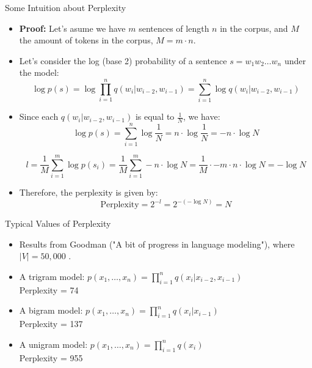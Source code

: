 \documentclass[10pt]{beamer}
\begin{document}
\begin{frame}{Some Intuition about Perplexity}
    \scriptsize
    \begin{itemize}
        
        
        \item \textbf{Proof:}  Let's asume we have $m$ sentences of length $n$ in the corpus, and $M$ the amount of tokens in the corpus, $M=m \cdot n$.
        
        \item Let's consider the log (base 2) probability of a sentence $s = w_1 w_2 \dots w_n$ under the model:
        \[
            \log p(s) = \log \prod_{i=1}^{n} q(w_i|w_{i-2}, w_{i-1}) = \sum_{i=1}^{n} \log q(w_i|w_{i-2}, w_{i-1})
        \]
        \item Since each $q(w_i|w_{i-2}, w_{i-1})$ is equal to $\frac{1}{N}$, we have:
        \[
            \log p(s) = \sum_{i=1}^{n} \log \frac{1}{N} = n \cdot \log \frac{1}{N} = -n \cdot \log N
        \]
        
        
        \[
            l =  \frac{1}{M} \sum_{i=1}^{m} \log p(s_i) = \frac{1}{M} \sum_{i=1}^{m} -n \cdot \log N  = \frac{1}{M} \cdot -m \cdot n \cdot \log N = - \log N 
        \]
        
        
        
        \item Therefore, the perplexity is given by:
        \[
            \text{Perplexity} = 2^{-l} = 2^{-(- \log N)} = N
        \]
    \end{itemize}
\end{frame}

\begin{frame}{Typical Values of Perplexity}
    \scriptsize
    \begin{itemize}
        \item Results from Goodman ("A bit of progress in language modeling"), where $|V| = 50,000$ \cite{goodman2001bit}.
        \item A trigram model: $p(x_1, \ldots, x_n) = \prod_{i=1}^n q(x_i | x_{i-2}, x_{i-1})$ \\
        Perplexity = 74
        \item A bigram model: $p(x_1, \ldots, x_n) = \prod_{i=1}^n q(x_i | x_{i-1})$ \\
        Perplexity = 137
        \item A unigram model: $p(x_1, \ldots, x_n) = \prod_{i=1}^n q(x_i)$ \\
        Perplexity = 955
    \end{itemize}
\end{frame}
\end{document}
